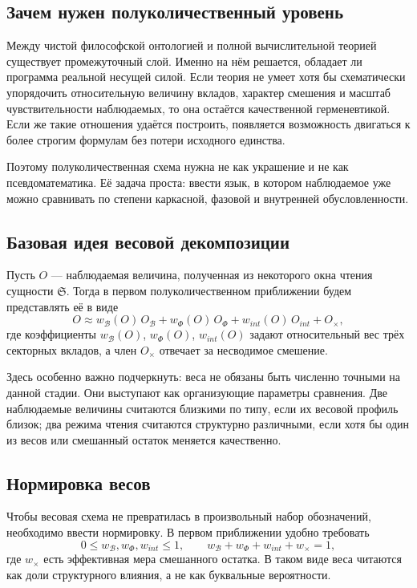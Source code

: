 \documentclass[12pt,a4paper]{article}
\begin{document}
\subsection{Зачем нужен полуколичественный уровень}

Между чистой философской онтологией и полной вычислительной теорией существует промежуточный слой. Именно на нём решается, обладает ли программа реальной несущей силой. Если теория не умеет хотя бы схематически упорядочить относительную величину вкладов, характер смешения и масштаб чувствительности наблюдаемых, то она остаётся качественной герменевтикой. Если же такие отношения удаётся построить, появляется возможность двигаться к более строгим формулам без потери исходного единства.

Поэтому полуколичественная схема нужна не как украшение и не как псевдоматематика. Её задача проста: ввести язык, в котором наблюдаемое уже можно сравнивать по степени каркасной, фазовой и внутренней обусловленности.

\subsection{Базовая идея весовой декомпозиции}

Пусть \(O\) --- наблюдаемая величина, полученная из некоторого окна чтения сущности \(\mathfrak{S}\). Тогда в первом полуколичественном приближении будем представлять её в виде
\begin{equation}
O \approx w_{\mathcal{B}}(O)\,O_{\mathcal{B}} + w_{\Phi}(O)\,O_{\Phi} + w_{int}(O)\,O_{int} + O_{\times},
\end{equation}
где коэффициенты \(w_{\mathcal{B}}(O)\), \(w_{\Phi}(O)\), \(w_{int}(O)\) задают относительный вес трёх секторных вкладов, а член \(O_{\times}\) отвечает за несводимое смешение.

Здесь особенно важно подчеркнуть: веса не обязаны быть численно точными на данной стадии. Они выступают как организующие параметры сравнения. Две наблюдаемые величины считаются близкими по типу, если их весовой профиль близок; два режима чтения считаются структурно различными, если хотя бы один из весов или смешанный остаток меняется качественно.

\subsection{Нормировка весов}

Чтобы весовая схема не превратилась в произвольный набор обозначений, необходимо ввести нормировку. В первом приближении удобно требовать
\begin{equation}
0 \leq w_{\mathcal{B}}, w_{\Phi}, w_{int} \leq 1,
\qquad
w_{\mathcal{B}} + w_{\Phi} + w_{int} + w_{\times} = 1,
\end{equation}
где \(w_{\times}\) есть эффективная мера смешанного остатка. В таком виде веса читаются как доли структурного влияния, а не как буквальные вероятности.
\end{document}
